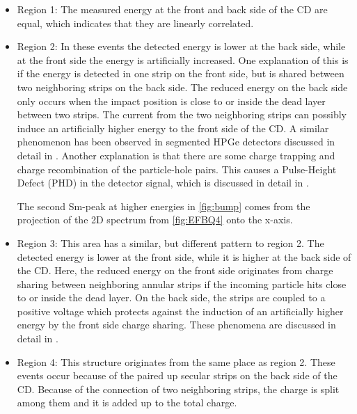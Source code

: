 \documentclass[twoside,english]{uiofysmaster/uiofysmaster}
\let\orgautoref\autoref
\renewcommand{\autoref}
        {%
		 \def\subsectionautorefname{Section}%
		 \def\subsubsectionautorefname{Section}%
          \orgautoref}
\begin{document}
\begin{itemize}
	\item Region 1: The measured energy at the front and back side of the CD are equal, which indicates that they are linearly correlated.
	\item Region 2: In these events the detected energy is lower at the back side, while at the front side the energy is artificially increased. 
	One explanation of this is if the energy is detected in one strip on the front side, but is shared between two neighboring strips on the back side.
	The reduced energy on the back side only occurs when the impact position is close to or inside the dead layer between two strips. 
	The current from the two neighboring strips can possibly induce an artificially higher energy to the front side of the CD. 
	A similar phenomenon has been observed in segmented HPGe detectors discussed in detail in \cite{Bruyneel2006a, Bruyneel2006b, Bruyneel, Descovich2005, Abt2017}.	
	Another explanation is that there are some charge trapping and charge recombination of the particle-hole pairs. 
	This causes a Pulse-Height Defect (PHD) in the detector signal, which is discussed in detail in \cite{Miller1962, Wilkins1971}.
	
	The second Sm-peak at higher energies in \autoref{fig:bump} comes from the projection of the 2D spectrum from \autoref{fig:EFBQ4} onto the x-axis.
	\item Region 3: This area has a similar, but different pattern to region 2. 
	The detected energy is lower at the front side, while it is higher at the back side of the CD. 
	Here, the reduced energy on the front side originates from charge sharing between neighboring annular strips if the incoming particle hits close to or inside the dead layer. 
	 On the back side, the strips are coupled to a positive voltage which protects against the induction of an artificially higher energy by the front side charge sharing. 
	These phenomena are discussed in detail in \cite{Grassi2014, Kramberger2002}.
	\item Region 4: This structure originates from the same place as region 2.
	These events occur because of the paired up secular strips on the back side of the CD.  
	Because of the connection of two neighboring strips, the charge is split among them and it is added up to the total charge.
\end{itemize}
\end{document}
